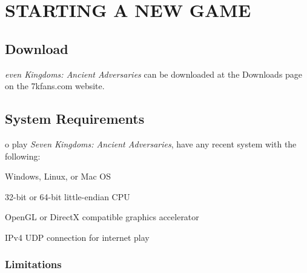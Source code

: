 
\chapter{\textsf{\textbf{STARTING A NEW GAME}}}

\section{\textsf{Download}}

\textit{even Kingdoms: Ancient Adversaries} can be downloaded at the Downloads page on the 7kfans.com website.


\section{\textsf{System Requirements}}


o play \textit{Seven Kingdoms: Ancient Adversaries}, have any recent system with the following:

\begin{changemargin}{0.5cm}{0cm} 
Windows, Linux, or Mac OS

32-bit or 64-bit little-endian CPU

OpenGL or DirectX compatible graphics accelerator

IPv4 UDP connection for internet play
\end{changemargin}

\subsection{\textsf{Limitations}}

